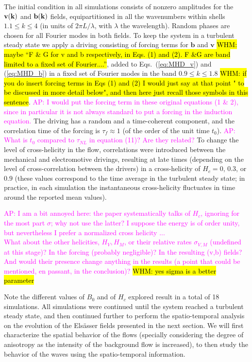 \documentclass[aip,pop,reprint,amsmath,amssymb,floatfix]{revtex4-1}
\def\AD#1{{\textcolor{magenta}{#1}}}
\def\WHM#1{{\hl{WHM: #1}}}
\renewcommand{\vec}[1]{\mathbf{#1}}
\begin{document}
The initial condition in all simulations consists of nonzero amplitudes for the ${\bf v}({\bf k})$ and ${\bf b}({\bf k})$ fields, equipartitioned in all the wavenumbers within shells $1.1 \leq k \leq 4$ (in units of $2\pi L/\lambda$, with $\lambda$ the wavelength). Random phases are chosen for all Fourier modes in both fields. To keep the system in a turbulent steady state we apply a driving consisting of forcing terms for $\vec{b}$ and $\vec{v}$ \WHM{maybe 
``F \& G  for v and b respectively, in Eqs. (1) and (2). F \&G are band limited to a fixed set of Fourier....''}, added to Eqs.~(\ref{eq:MHD_v}) and (\ref{eq:MHD_b}) in a fixed set of Fourier modes in the band $0.9\leq k \leq 1.8$ \WHM{if you do insert forcing terms in Eqs (1) and (2) I would just say at that point " to be discussed in more detail below", and then here just recall those symbols in this sentence}. 
\AD{AP: I would put the forcing term in these original equations (1 \& 2), since in particular it is not always standard to put a forcing in the induction equation.}
The driving has a random and a time-coherent component, and the correlation time of the forcing is $\tau_f \approx 1$ (of the order of the unit time $t_0$).
\AD{AP: What is $t_0$ compared to $\tau_{NL}$ in equation (11)? Are they related?}
 To change the level of cross-helicity in the flow, correlations were introduced between the mechanical and electromotive drivings, resulting at late times (depending on the level of cross-correlation between the drivers) in a cross-helicity of $H_c=0$, $0.3$, or $0.9$ (these values correspond to the time average in the turbulent steady state; in practice, in each simulation the instantaneous cross-helicity fluctuates in time around the reported mean values).
 
 \AD{AP: I am a bit annoyed here: the paper systematically talks of $H_c$, ignoring for the most part $\sigma$; why not use the latter? I suppose the energy is of order unity, but nevertheless I prefer a normalized cross helicity ... \\
What about the other helicities, $H_V, H_M$, or their relative rates $\sigma_{V,M}$ (undefined at this stage)? In the forcing (probably negligible)? In the resulting (v,b) fields? And would their presence change anything in the results (a point that could be mentioned, en passant, in the conclusion)?} \WHM{yes sigma is a better parameter}

Note the different values of $B_0$ and of $H_c$ explored result in a total of 18 simulations. All simulations were continued until the system reached a turbulent steady state, and then continued further to perform the spatio-temporal analysis on the evolution of the Els\"asser fields presented in the next section. We will first characterize the spatial behavior of the flows (specially considering the degree of anisotropy as the intensity of the background flow is increased), to then study the behavior of the waves using the spatio-temporal information.
\end{document}
